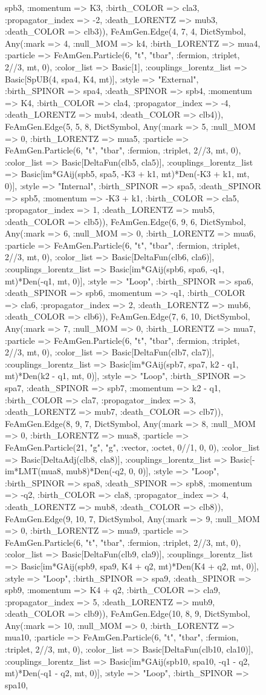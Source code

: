 \documentclass{revtex4}
\begin{document}
\begin{figure}[!htb]
\begin{center}
{spb3, :momentum => K3, :birth_COLOR => cla3, :propagator_index => -2, :death_LORENTZ => mub3, :death_COLOR => clb3)), FeAmGen.Edge(4, 7, 4, Dict{Symbol, Any}(:mark => 4, :null_MOM => k4, :birth_LORENTZ => mua4, :particle => FeAmGen.Particle(6, "t", "tbar", :fermion, :triplet, 2//3, mt, 0), :color_list => Basic[1], :couplings_lorentz_list => Basic[SpUB(4, spa4, K4, mt)], :style => "External", :birth_SPINOR => spa4, :death_SPINOR => spb4, :momentum => K4, :birth_COLOR => cla4, :propagator_index => -4, :death_LORENTZ => mub4, :death_COLOR => clb4)), FeAmGen.Edge(5, 5, 8, Dict{Symbol, Any}(:mark => 5, :null_MOM => 0, :birth_LORENTZ => mua5, :particle => FeAmGen.Particle(6, "t", "tbar", :fermion, :triplet, 2//3, mt, 0), :color_list => Basic[DeltaFun(clb5, cla5)], :couplings_lorentz_list => Basic[im*GAij(spb5, spa5, -K3 + k1, mt)*Den(-K3 + k1, mt, 0)], :style => "Internal", :birth_SPINOR => spa5, :death_SPINOR => spb5, :momentum => -K3 + k1, :birth_COLOR => cla5, :propagator_index => 1, :death_LORENTZ => mub5, :death_COLOR => clb5)), FeAmGen.Edge(6, 9, 6, Dict{Symbol, Any}(:mark => 6, :null_MOM => 0, :birth_LORENTZ => mua6, :particle => FeAmGen.Particle(6, "t", "tbar", :fermion, :triplet, 2//3, mt, 0), :color_list => Basic[DeltaFun(clb6, cla6)], :couplings_lorentz_list => Basic[im*GAij(spb6, spa6, -q1, mt)*Den(-q1, mt, 0)], :style => "Loop", :birth_SPINOR => spa6, :death_SPINOR => spb6, :momentum => -q1, :birth_COLOR => cla6, :propagator_index => 2, :death_LORENTZ => mub6, :death_COLOR => clb6)), FeAmGen.Edge(7, 6, 10, Dict{Symbol, Any}(:mark => 7, :null_MOM => 0, :birth_LORENTZ => mua7, :particle => FeAmGen.Particle(6, "t", "tbar", :fermion, :triplet, 2//3, mt, 0), :color_list => Basic[DeltaFun(clb7, cla7)], :couplings_lorentz_list => Basic[im*GAij(spb7, spa7, k2 - q1, mt)*Den(k2 - q1, mt, 0)], :style => "Loop", :birth_SPINOR => spa7, :death_SPINOR => spb7, :momentum => k2 - q1, :birth_COLOR => cla7, :propagator_index => 3, :death_LORENTZ => mub7, :death_COLOR => clb7)), FeAmGen.Edge(8, 9, 7, Dict{Symbol, Any}(:mark => 8, :null_MOM => 0, :birth_LORENTZ => mua8, :particle => FeAmGen.Particle(21, "g", "g", :vector, :octet, 0//1, 0, 0), :color_list => Basic[DeltaAdj(clb8, cla8)], :couplings_lorentz_list => Basic[-im*LMT(mua8, mub8)*Den(-q2, 0, 0)], :style => "Loop", :birth_SPINOR => spa8, :death_SPINOR => spb8, :momentum => -q2, :birth_COLOR => cla8, :propagator_index => 4, :death_LORENTZ => mub8, :death_COLOR => clb8)), FeAmGen.Edge(9, 10, 7, Dict{Symbol, Any}(:mark => 9, :null_MOM => 0, :birth_LORENTZ => mua9, :particle => FeAmGen.Particle(6, "t", "tbar", :fermion, :triplet, 2//3, mt, 0), :color_list => Basic[DeltaFun(clb9, cla9)], :couplings_lorentz_list => Basic[im*GAij(spb9, spa9, K4 + q2, mt)*Den(K4 + q2, mt, 0)], :style => "Loop", :birth_SPINOR => spa9, :death_SPINOR => spb9, :momentum => K4 + q2, :birth_COLOR => cla9, :propagator_index => 5, :death_LORENTZ => mub9, :death_COLOR => clb9)), FeAmGen.Edge(10, 8, 9, Dict{Symbol, Any}(:mark => 10, :null_MOM => 0, :birth_LORENTZ => mua10, :particle => FeAmGen.Particle(6, "t", "tbar", :fermion, :triplet, 2//3, mt, 0), :color_list => Basic[DeltaFun(clb10, cla10)], :couplings_lorentz_list => Basic[im*GAij(spb10, spa10, -q1 - q2, mt)*Den(-q1 - q2, mt, 0)], :style => "Loop", :birth_SPINOR => spa10, }
\end{center}
\end{figure}
\end{document}
